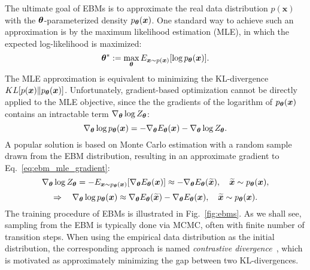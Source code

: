 The ultimate goal of EBMs is to approximate the real data distribution $p(\bm{x})$ with the $\bm{\theta}$-parameterized density $p_{\bm{\theta}}(\bm{x})$. One standard way to achieve such an approximation is by the maximum likelihood estimation (MLE), in which the expected log-likelihood is maximized:
\begin{equation}
    \bm{\theta}^* := \max_{\bm{\theta}}E_{\bm{x}\sim p(\bm{x})} [\log p_{\bm{\theta}}(\bm{x})].
\end{equation}
The MLE approximation is equivalent to minimizing the KL-divergence $KL[p(\bm{x}) \| p_{\bm{\theta}}(\bm{x})]$. 
Unfortunately, gradient-based optimization cannot be directly applied to the MLE objective, since the the gradients of the logarithm of $p_{\bm{\theta}}(\bm{x})$ contains an intractable term $\nabla_{\bm{\theta}}\log Z_{\bm{\theta}}$: 
\begin{equation}
    \nabla_{\bm{\theta}}\log p_{\bm{\theta}}(\bm{x})=-\nabla_{\bm{\theta}}E_{\bm{\theta}}(\bm{x})-\nabla_{\bm{\theta}}\log Z_{\bm{\theta}}.
\label{eq:ebm_mle_gradient}
\end{equation}
A popular solution is based on Monte Carlo estimation with a random sample drawn from the EBM distribution, resulting in an approximate gradient to Eq.~\eqref{eq:ebm_mle_gradient}:
\begin{equation}
    \nabla_{\bm{\theta}}\log Z_{\bm{\theta}}=-E_{\bm{x}\sim p_{\bm{\theta}}(\bm{x})}[\nabla_{\bm{\theta}}E_{\bm{\theta}}(\bm{x})] \approx-\nabla_{\bm{\theta}}E_{\bm{\theta}}(\widetilde{\bm{x}}), \quad \widetilde{\bm{x}}\sim p_{\bm{\theta}}(\bm{x}),
\label{eq:ebm_mle_approx_gradient}
\end{equation}
\begin{equation}
    \Rightarrow \quad \nabla_{\bm{\theta}}\log p_{\bm{\theta}}(\bm{x}) \approx \nabla_{\bm{\theta}}E_{\bm{\theta}}(\widetilde{\bm{x}}) - \nabla_{\bm{\theta}}E_{\bm{\theta}}(\bm{x}), \quad \widetilde{\bm{x}}\sim p_{\bm{\theta}}(\bm{x}).
    \label{eq:grad_ebm}
\end{equation}
The training procedure of EBMs is illustrated in Fig.~\ref{fig:ebms}. As we shall see, sampling from the EBM is typically done via MCMC, often with finite number of transition steps. When using the empirical data distribution as the initial distribution, the corresponding approach is named \emph{contrastive divergence}~\citep{hinton2002training}, which is motivated as approximately minimizing the gap between two KL-divergences. 

